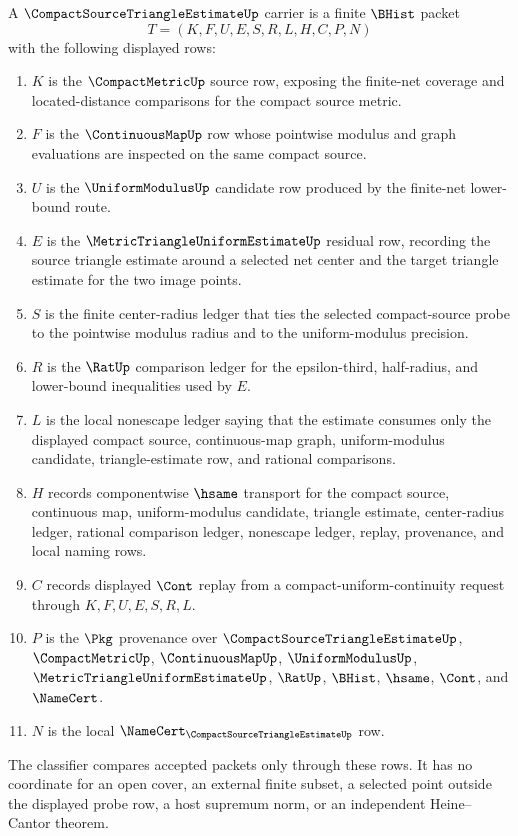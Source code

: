 \begin{definition}
\label{def:compact-source-triangle-estimate-carrier}
A $\CompactSourceTriangleEstimateUp$ carrier is a finite $\BHist$ packet
$$
T=(K,F,U,E,S,R,L,H,C,P,N)
$$
with the following displayed rows:
\begin{enumerate}
\item $K$ is the $\CompactMetricUp$ source row, exposing the finite-net coverage and located-distance comparisons for the compact source metric.
\item $F$ is the $\ContinuousMapUp$ row whose pointwise modulus and graph evaluations are inspected on the same compact source.
\item $U$ is the $\UniformModulusUp$ candidate row produced by the finite-net lower-bound route.
\item $E$ is the $\MetricTriangleUniformEstimateUp$ residual row, recording the source triangle estimate around a selected net center and the target triangle estimate for the two image points.
\item $S$ is the finite center-radius ledger that ties the selected compact-source probe to the pointwise modulus radius and to the uniform-modulus precision.
\item $R$ is the $\RatUp$ comparison ledger for the epsilon-third, half-radius, and lower-bound inequalities used by $E$.
\item $L$ is the local nonescape ledger saying that the estimate consumes only the displayed compact source, continuous-map graph, uniform-modulus candidate, triangle-estimate row, and rational comparisons.
\item $H$ records componentwise $\hsame$ transport for the compact source, continuous map, uniform-modulus candidate, triangle estimate, center-radius ledger, rational comparison ledger, nonescape ledger, replay, provenance, and local naming rows.
\item $C$ records displayed $\Cont$ replay from a compact-uniform-continuity request through $K,F,U,E,S,R,L$.
\item $P$ is the $\Pkg$ provenance over $\CompactSourceTriangleEstimateUp$, $\CompactMetricUp$, $\ContinuousMapUp$, $\UniformModulusUp$, $\MetricTriangleUniformEstimateUp$, $\RatUp$, $\BHist$, $\hsame$, $\Cont$, and $\NameCert$.
\item $N$ is the local $\NameCert_{\CompactSourceTriangleEstimateUp}$ row.
\end{enumerate}
The classifier compares accepted packets only through these rows. It has no coordinate for an open cover, an external finite subset, a selected point outside the displayed probe row, a host supremum norm, or an independent Heine--Cantor theorem.
\end{definition}

